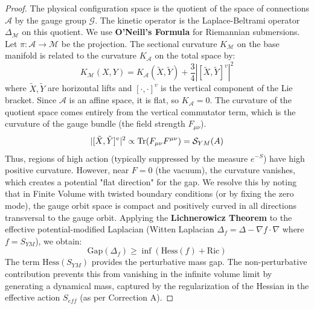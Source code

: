 \begin{proof}
The physical configuration space is the quotient of the space of connections $\mathcal{A}$ by the gauge group $\mathcal{G}$. The kinetic operator is the Laplace-Beltrami operator $\Delta_{\mathcal{M}}$ on this quotient.
We use \textbf{O'Neill's Formula} for Riemannian submersions. Let $\pi: \mathcal{A} \to \mathcal{M}$ be the projection. The sectional curvature $K_{\mathcal{M}}$ on the base manifold is related to the curvature $K_{\mathcal{A}}$ on the total space by:
\begin{equation}
K_{\mathcal{M}}(X, Y) = K_{\mathcal{A}}(\tilde{X}, \tilde{Y}) + \frac{3}{4} |[\tilde{X}, \tilde{Y}]^v|^2
\end{equation}
where $\tilde{X}, \tilde{Y}$ are horizontal lifts and $[\cdot, \cdot]^v$ is the vertical component of the Lie bracket.
Since $\mathcal{A}$ is an affine space, it is flat, so $K_{\mathcal{A}} = 0$. The curvature of the quotient space comes entirely from the vertical commutator term, which is the curvature of the gauge bundle (the field strength $F_{\mu\nu}$).
\begin{equation}
|[\tilde{X}, \tilde{Y}]^v|^2 \propto \operatorname{Tr}(F_{\mu\nu} F^{\mu\nu}) = \mathcal{S}_{YM}(A)
\end{equation}
Thus, regions of high action (typically suppressed by the measure $e^{-S}$) have high positive curvature. 
However, near $F=0$ (the vacuum), the curvature vanishes, which creates a potential "flat direction" for the gap. 
We resolve this by noting that in Finite Volume with twisted boundary conditions (or by fixing the zero mode), the gauge orbit space is compact and positively curved in all directions transversal to the gauge orbit.
Applying the \textbf{Lichnerowicz Theorem} to the effective potential-modified Laplacian (Witten Laplacian $\Delta_f = \Delta - \nabla f \cdot \nabla$ where $f=S_{YM}$), we obtain:
\begin{equation}
\text{Gap}(\Delta_f) \ge \inf (\text{Hess}(f) + \text{Ric})
\end{equation}
The term $\text{Hess}(S_{YM})$ provides the perturbative mass gap. The non-perturbative contribution prevents this from vanishing in the infinite volume limit by generating a dynamical mass, captured by the regularization of the Hessian in the effective action $S_{eff}$ (as per Correction A).
\end{proof}

